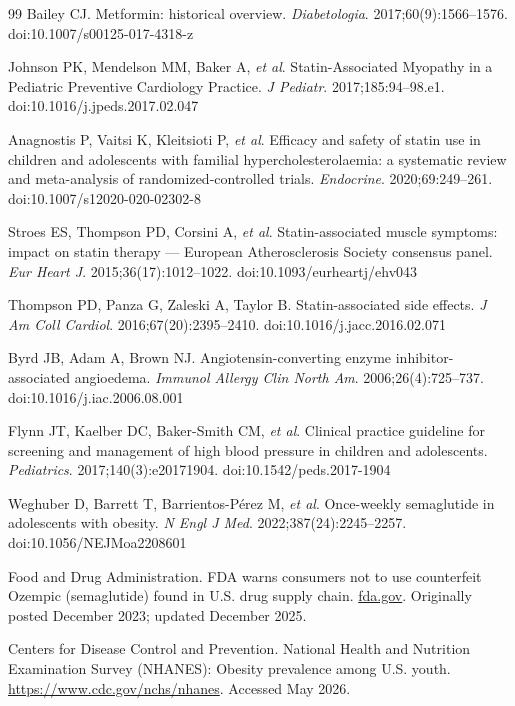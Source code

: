 \documentclass[10pt]{article}
\begin{document}
\begin{thebibliography}{99}
Bailey CJ.
Metformin: historical overview.
\textit{Diabetologia}. 2017;60(9):1566--1576.
doi:10.1007/s00125-017-4318-z
 
Johnson PK, Mendelson MM, Baker A, \textit{et al}.
Statin-Associated Myopathy in a Pediatric Preventive Cardiology Practice.
\textit{J Pediatr}. 2017;185:94--98.e1.
doi:10.1016/j.jpeds.2017.02.047
 
Anagnostis P, Vaitsi K, Kleitsioti P, \textit{et al}.
Efficacy and safety of statin use in children and adolescents with familial hypercholesterolaemia: a systematic review and meta-analysis of randomized-controlled trials.
\textit{Endocrine}. 2020;69:249--261.
doi:10.1007/s12020-020-02302-8
 
Stroes ES, Thompson PD, Corsini A, \textit{et al}.
Statin-associated muscle symptoms: impact on statin
therapy --- European Atherosclerosis Society consensus panel.
\textit{Eur Heart J}. 2015;36(17):1012--1022.
doi:10.1093/eurheartj/ehv043
 
Thompson PD, Panza G, Zaleski A, Taylor B.
Statin-associated side effects.
\textit{J Am Coll Cardiol}. 2016;67(20):2395--2410.
doi:10.1016/j.jacc.2016.02.071
 
Byrd JB, Adam A, Brown NJ.
Angiotensin-converting enzyme inhibitor-associated angioedema.
\textit{Immunol Allergy Clin North Am}. 2006;26(4):725--737.
doi:10.1016/j.iac.2006.08.001
 
Flynn JT, Kaelber DC, Baker-Smith CM, \textit{et al}.
Clinical practice guideline for screening and management
of high blood pressure in children and adolescents.
\textit{Pediatrics}. 2017;140(3):e20171904.
doi:10.1542/peds.2017-1904
 
Weghuber D, Barrett T, Barrientos-P\'{e}rez M, \textit{et al}.
Once-weekly semaglutide in adolescents with obesity.
\textit{N Engl J Med}. 2022;387(24):2245--2257.
doi:10.1056/NEJMoa2208601
 
Food and Drug Administration.
FDA warns consumers not to use counterfeit Ozempic
(semaglutide) found in U.S. drug supply chain.
\href{https://www.fda.gov/drugs/drug-alerts-and-statements/fda-warns-consumers-not-use-counterfeit-ozempic-semaglutide-found-us-drug-supply-chain}{fda.gov}.
Originally posted December 2023; updated December 2025.
 
Centers for Disease Control and Prevention.
National Health and Nutrition Examination Survey (NHANES):
Obesity prevalence among U.S. youth.
\url{https://www.cdc.gov/nchs/nhanes}.
Accessed May 2026.
 

\end{thebibliography}
\end{document}
